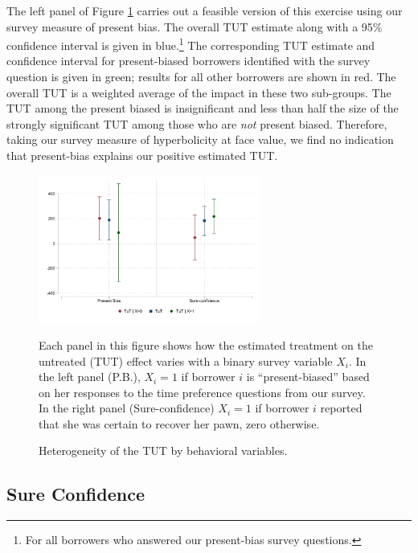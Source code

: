 \begin{appendix}
The left panel of Figure \ref{tut_beh_partition} carries out a feasible version of this exercise using our survey measure of present bias.
The overall TUT estimate along with a 95\% confidence interval is given in blue.\footnote{For all borrowers who answered our present-bias survey questions.}
The corresponding TUT estimate and confidence interval for present-biased borrowers identified with the survey question is given in green; results for all other borrowers are shown in red.
The overall TUT is a weighted average of the impact in these two sub-groups.  The TUT among the present biased is insignificant and less than half the size of the strongly significant TUT among those who are \textit{not} present biased. Therefore, taking our survey measure of hyperbolicity at face value, we find no indication that present-bias explains our positive estimated TUT. 



\begin{figure}
\caption{Heterogeneity of the TUT by behavioral variables.}
    \begin{center}
        \centering
        \includegraphics[width=0.65\textwidth]{Figuras/tut_beh_partition.pdf} 
    \end{center}  
 \footnotesize{Each panel in this figure shows how the estimated treatment on the untreated (TUT) effect varies with a binary survey variable $X_i$. In the left panel (P.B.), $X_i = 1$ if borrower $i$ is ``present-biased'' based on her responses to the time preference questions from our survey. In the right panel (Sure-confidence) $X_i = 1$ if  borrower $i$ reported that she was certain to recover her pawn, zero otherwise. }
    \label{tut_beh_partition}

\end{figure}
\subsection{Sure Confidence} \label{App_sureconfidence}


\end{appendix}
